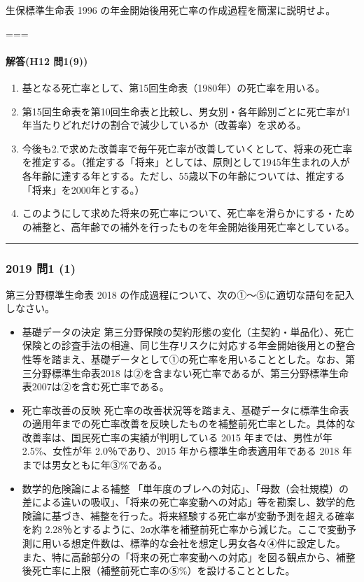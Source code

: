 \documentclass[
]{article}
\providecommand{\tightlist}{%
  \setlength{\itemsep}{0pt}\setlength{\parskip}{0pt}}
\begin{document}
生保標準生命表 1996 の年金開始後用死亡率の作成過程を簡潔に説明せよ。

===

\hypertarget{ux89e3ux7b54h12-ux554f19}{%
\paragraph{解答(H12 問1(9))}\label{ux89e3ux7b54h12-ux554f19}}

\begin{enumerate}
\def\labelenumi{\arabic{enumi}.}
\tightlist
\item
  基となる死亡率として、第15回生命表（1980年）の死亡率を用いる。
\item
  第15回生命表を第10回生命表と比較し、男女別・各年齢別ごとに死亡率が1年当たりどれだけの割合で減少しているか（改善率）を求める。
\item
  今後も2.で求めた改善率で毎午死亡率が改善していくとして、将来の死亡率を推定する。（推定する「将来」としては、原則として1945年生まれの人が各年齢に達する年とする。ただし、55歳以下の年齢については、推定する「将来」を2000年とする。）
\item
  このようにして求めた将来の死亡率について、死亡率を滑らかにする・ための補整と、高年齢での補外を行ったものを年金開始後用死亡率としている。
\end{enumerate}

\begin{center}\rule{0.5\linewidth}{0.5pt}\end{center}

\hypertarget{ux554f1-1}{%
\subsubsection{2019 問1 (1)}\label{ux554f1-1}}

第三分野標準生命表 2018
の作成過程について、次の①～⑤に適切な語句を記入しなさい。

\begin{itemize}
\tightlist
\item
  基礎データの決定
  第三分野保険の契約形態の変化（主契約・単品化）、死亡保険との診査手法の相違、同じ生存リスクに対応する年金開始後用との整合性等を踏まえ、基礎データとして①の死亡率を用いることとした。なお、第三分野標準生命表2018
  は②を含まない死亡率であるが、第三分野標準生命表2007は②を含む死亡率である。
\item
  死亡率改善の反映
  死亡率の改善状況等を踏まえ、基礎データに標準生命表の適用年までの死亡率改善を反映したものを補整前死亡率とした。具体的な改善率は、国民死亡率の実績が判明している
  2015 年までは、男性が年 2.5\%、女性が年 2.0％であり、2015
  年から標準生命表適用年である 2018 年までは男女ともに年③\%である。
\item
  数学的危険論による補整
  「単年度のブレヘの対応」、「母数（会社規模）の差による違いの吸収」、「将来の死亡率変動への対応」等を勘案し、数学的危険論に基づき、補整を行った。将来経験する死亡率が変動予測を超える確率を約
  2.28％とするように、2σ水準を補整前死亡率から減じた。ここで変動予測に用いる想定件数は、標準的な会社を想定し男女各々④件に設定した。
  また、特に高齢部分の「将来の死亡率変動への対応」を図る観点から、補整後死亡率に上限（補整前死亡率の⑤\%）を設けることとした。
\end{itemize}
\end{document}
